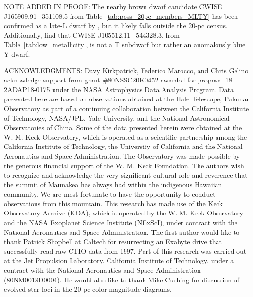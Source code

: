 \documentclass[twocolumn,tighten,twocolappendix]{aastex631}
\begin{document}
NOTE ADDED IN PROOF: The nearby brown dwarf candidate CWISE J165909.91$-$351108.5 from Table~\ref{tab:poss_20pc_members_MLTY} has been confirmed as a late-L dwarf by \cite{robbins2023a}, but it likely falls outside the 20-pc census. Additionally, \cite{robbins2023b} find that CWISE J105512.11+544328.3, from Table~\ref{tab:low_metallicity}, is not a T subdwarf but rather an anomalously blue Y dwarf.



\clearpage

ACKNOWLEDGMENTS: Davy Kirkpatrick, Federico Marocco, and Chris Gelino acknowledge support from grant \#80NSSC20K0452 awarded for proposal 18-2ADAP18-0175 under the NASA Astrophysics Data Analysis Program. 
Data presented here are based on observations obtained at the Hale Telescope, Palomar Observatory as part of a continuing collaboration between the California Institute of Technology, NASA/JPL, Yale University, and the National Astronomical Observatories of China. Some of the data presented herein were obtained at the W. M. Keck Observatory, which is operated as a scientific partnership among the California Institute of Technology, the University of California and the National Aeronautics and Space Administration. The Observatory was made possible by the generous financial support of the W. M. Keck Foundation. The authors wish to recognize and acknowledge the very significant cultural role and reverence that the summit of Maunakea has always had within the indigenous Hawaiian community.  We are most fortunate to have the opportunity to conduct observations from this mountain.
This research has made use of the Keck Observatory Archive (KOA), which is operated by the W. M. Keck Observatory and the NASA Exoplanet Science Institute (NExScI), under contract with the National Aeronautics and Space Administration.
The first author would like to thank Patrick Shopbell at Caltech for resurrecting an Exabyte drive that successfully read raw CTIO data from 1997.
Part of this research was carried out at the Jet Propulsion Laboratory, California Institute of Technology, under a contract with the National Aeronautics and Space Administration (80NM0018D0004). He would also like to thank Mike Cushing for discussion of evolved star loci in the 20-pc color-magnitude diagrams.
\end{document}
